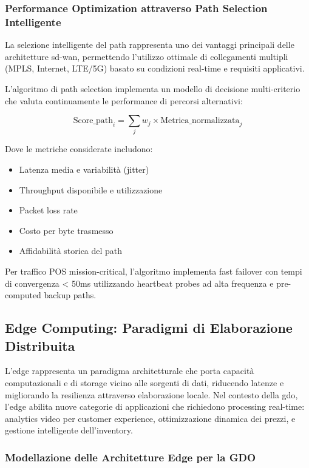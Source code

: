 \subsubsection{Performance Optimization attraverso Path Selection Intelligente}

La selezione intelligente del path rappresenta uno dei vantaggi principali delle architetture \gls{sd-wan}, permettendo l'utilizzo ottimale di collegamenti multipli (MPLS, Internet, LTE/5G) basato su condizioni real-time e requisiti applicativi.

L'algoritmo di path selection implementa un modello di decisione multi-criterio che valuta continuamente le performance di percorsi alternativi:

\begin{equation}
\text{Score\_path}_i = \sum_{j} w_j \times \text{Metrica\_normalizzata}_j
\label{eq:score-path}
\end{equation}

Dove le metriche considerate includono:
\begin{itemize}
    \item Latenza media e variabilità (jitter)
    \item Throughput disponibile e utilizzazione
    \item Packet loss rate
    \item Costo per byte trasmesso
    \item Affidabilità storica del path
\end{itemize}

Per traffico POS mission-critical, l'algoritmo implementa fast failover con tempi di convergenza < 50ms utilizzando heartbeat probes ad alta frequenza e pre-computed backup paths.

\subsection{Edge Computing: Paradigmi di Elaborazione Distribuita}
\label{subsec:edge-computing}

L'\gls{edge} rappresenta un paradigma architetturale che porta capacità computazionali e di storage vicino alle sorgenti di dati, riducendo latenze e migliorando la resilienza attraverso elaborazione locale. Nel contesto della \gls{gdo}, l'\gls{edge} abilita nuove categorie di applicazioni che richiedono processing real-time: analytics video per customer experience, ottimizzazione dinamica dei prezzi, e gestione intelligente dell'inventory.

\subsubsection{Modellazione delle Architetture Edge per la GDO}

